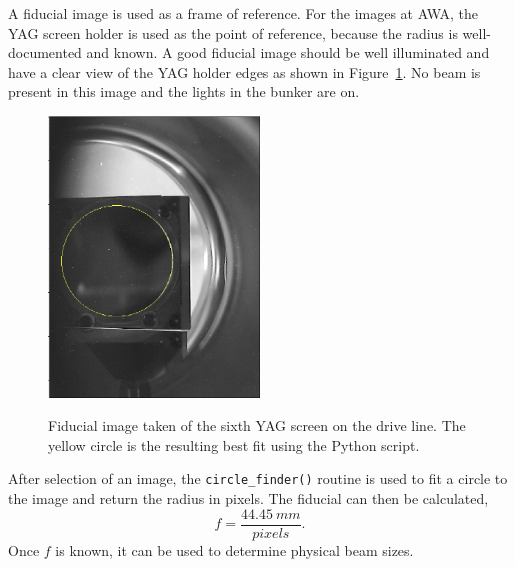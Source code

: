 A fiducial image is used as a frame of reference. 
For the images at AWA, the YAG screen holder is used 
as the point of reference, because the radius is well-documented and known.
A good fiducial image should be well illuminated and have a clear view of the YAG holder 
edges as shown in Figure~\ref{fig:fiducial}.
No beam is present in this image and the lights in the bunker are on.
\begin{figure}
	\centering
	\includegraphics[width=0.5\textwidth]{images/YAG6_kicker_fiducial}
	\label{fig:fiducial}
	\caption{Fiducial image taken of the sixth YAG screen on the drive line.
	The yellow circle is the resulting best fit using the Python script. }
\end{figure}
After selection of an image, the \verb|circle_finder()| routine is used 
to fit a circle to the image and return the radius in pixels.
The fiducial can then be calculated,
\begin{equation}
	f = \frac{\SI{44.45}{mm}}{pixels}. 
\end{equation}
Once $f$ is known, it can be used to determine physical beam sizes.


